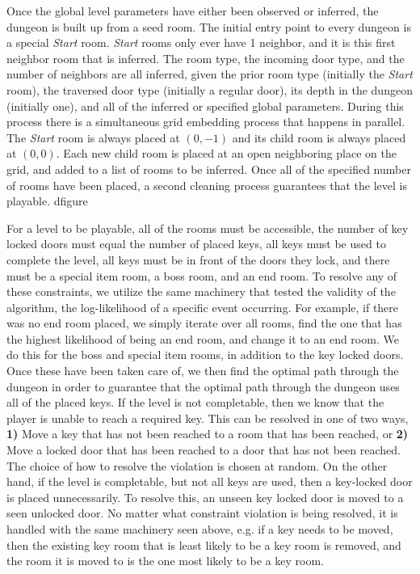 \documentclass[a4paper]{article}
\begin{document}
Once the global level parameters have either been observed or inferred, the dungeon is built up from a seed room. The initial entry point to every dungeon is a special \textit{Start} room. \textit{Start} rooms only ever have 1 neighbor, and it is this first neighbor room that is inferred. The room type, the incoming door type, and the number of neighbors are all inferred, given the prior room type (initially the \textit{Start} room), the traversed door type (initially a regular door), its depth in the dungeon (initially one), and all of the inferred or specified global parameters. During this process there is a simultaneous grid embedding process that happens in parallel. The \textit{Start} room is always placed at $(0,-1)$ and its child room is always placed at $(0,0)$. Each new child room is placed at an open neighboring place on the grid, and added to a list of rooms to be inferred. Once all of the specified number of rooms have been placed, a second cleaning process guarantees that the level is playable. d{figure}

For a level to be playable, all of the rooms must be accessible, the number of key locked doors must equal the number of placed keys, all keys must be used to complete the level, all keys must be in front of the doors they lock, and there must be a special item room, a boss room, and an end room. To resolve any of these constraints, we utilize the same machinery that tested the validity of the algorithm, the log-likelihood of a specific event occurring. For example, if there was no end room placed, we simply iterate over all rooms, find the one that has the highest likelihood of being an end room, and change it to an end room. We do this for the boss and special item rooms, in addition to the key locked doors. Once these have been taken care of, we then find the optimal path through the dungeon in order to guarantee that the optimal path through the dungeon uses all of the placed keys. If the level is not completable, then we know that the player is unable to reach a required key. This can be resolved in one of two ways, \textbf{1)} Move a key that has not been reached to a room that has been reached, or \textbf{2)} Move a locked door that has been reached to a door that has not been reached. The choice of how to resolve the violation is chosen at random. On the other hand, if the level is completable, but not all keys are used, then a key-locked door is placed unnecessarily.  To resolve this, an unseen key locked door is moved to a seen unlocked door. No matter what constraint violation is being resolved, it is handled with the same machinery seen above, e.g. if a key needs to be moved, then the existing key room that is least likely to be a key room is removed, and the room it is moved to is the one most likely to be a key room.
\end{document}
